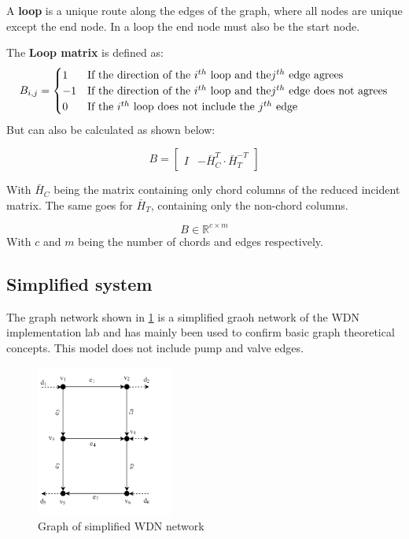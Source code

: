 A \textbf{loop} is a unique route along the edges of the graph, where all nodes are unique except the end node.  In a loop the end node must also be the start node. 

The \textbf{Loop matrix} is defined as:
\begin{equation*}
	B_{i,j} = \begin{cases}
		1 & \text{If the direction of the $ i^{th} $ loop and the} \text{$j^{th}$ edge agrees}\\
		-1 & \text{If the direction of the $ i^{th} $ loop and the} \text{$j^{th}$ edge does not agrees}\\
		0 & \text{If the $ i^{th} $ loop does not include the $ j^{th} $ edge}\\
	\end{cases}
\end{equation*}
But can also be calculated as shown below:

\begin{equation}\label{eq:LoopMatrix}
	B = \begin{bmatrix}
		I & -\bar{H}_{C}^{T}\cdot\bar{H}_{T}^{-T}
	\end{bmatrix}
\end{equation}

With $\bar{H}_{C}$ being the matrix containing only chord columns of the reduced incident matrix. The same goes for  $\bar{H}_{T}$, containing only the non-chord columns. 

\begin{equation*}
	B\in \mathbb{R}^{c\times m}
\end{equation*}
With $c$ and $m$ being the number of chords and edges respectively.

\newpage
\subsection{Simplified system}
The graph network shown in \cref{fig:graph} is a simplified graoh network of the WDN implementation lab and has mainly been used to confirm basic graph theoretical concepts. This model does not include pump and valve edges.  
\begin{figure}[h!]
	\centering
	\includegraphics[width=0.4\textwidth]{Pictures/Graph.png}
	\caption{Graph of simplified WDN network \cite{Rathore930}}
	\label{fig:graph}
\end{figure}

